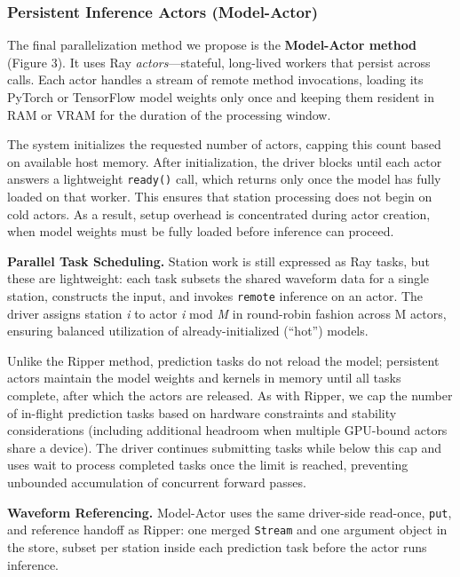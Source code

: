 \subsubsection{Persistent Inference Actors (Model-Actor)}

The final parallelization method we propose is the \textbf{Model-Actor method} (Figure 3). It uses Ray \emph{actors}—stateful, long-lived workers that persist across calls. Each actor handles a stream of remote method invocations, loading its PyTorch or TensorFlow model weights only once and keeping them resident in RAM or VRAM for the duration of the processing window.

The system initializes the requested number of actors, capping this count based on available host memory. After initialization, the driver blocks until each actor answers a lightweight \texttt{ready()} call, which returns only once the model has fully loaded on that worker. This ensures that station processing does not begin on cold actors. As a result, setup overhead is concentrated during actor creation, when model weights must be fully loaded before inference can proceed.

\textbf{Parallel Task Scheduling.} Station work is still expressed as Ray tasks, but these are lightweight: each task subsets the shared waveform data for a single station, constructs the input, and invokes \texttt{remote} inference on an actor. The driver assigns station \emph{i} to actor \emph{i} mod \emph{M} in round-robin fashion across M actors, ensuring balanced utilization of already-initialized (“hot”) models.

Unlike the Ripper method, prediction tasks do not reload the model; persistent actors maintain the model weights and kernels in memory until all tasks complete, after which the actors are released. As with Ripper, we cap the number of in-flight prediction tasks based on hardware constraints and stability considerations (including additional headroom when multiple GPU-bound actors share a device). The driver continues submitting tasks while below this cap and uses wait to process completed tasks once the limit is reached, preventing unbounded accumulation of concurrent forward passes.

\textbf{Waveform Referencing.} Model-Actor uses the same driver-side read-once, \texttt{put}, and reference handoff as Ripper: one merged \texttt{Stream} and one argument object in the store, subset per station inside each prediction task before the actor runs inference.

